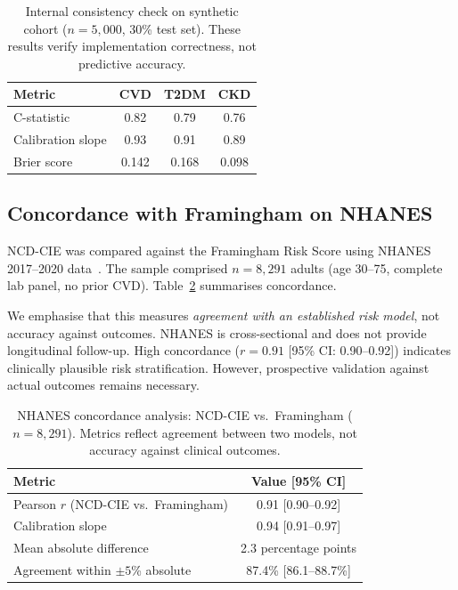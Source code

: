 \documentclass[runningheads]{llncs}
\begin{document}
\renewcommand{\arraystretch}{1.2}
\begin{table}[t]
\centering
\caption{Internal consistency check on synthetic cohort ($n = 5{,}000$,
30\% test set).  These results verify implementation correctness,
not predictive accuracy.}
\label{tab:synthetic}
\small
\begin{tabular}{@{}lccc@{}}
\toprule
\textbf{Metric} & \textbf{CVD} & \textbf{T2DM} & \textbf{CKD} \\
\midrule
C-statistic        & 0.82 & 0.79 & 0.76 \\
Calibration slope  & 0.93 & 0.91 & 0.89 \\
Brier score        & 0.142 & 0.168 & 0.098 \\
\bottomrule
\end{tabular}
\end{table}
\renewcommand{\arraystretch}{1.0}

\subsection{Concordance with Framingham on NHANES}\label{sec:nhanes}

NCD-CIE was compared against the Framingham Risk Score using NHANES
2017--2020 data~\cite{nhanes2020}.
The sample comprised $n = 8{,}291$ adults (age 30--75, complete lab
panel, no prior CVD).
Table~\ref{tab:nhanes} summarises concordance.

We emphasise that this measures \emph{agreement with an established
risk model}, not accuracy against outcomes.
NHANES is cross-sectional and does not provide longitudinal follow-up.
High concordance ($r = 0.91$ [95\% CI: 0.90--0.92]) indicates
clinically plausible risk stratification.
However, prospective validation against actual outcomes remains
necessary.

\renewcommand{\arraystretch}{1.2}
\begin{table}[t]
\centering
\caption{NHANES concordance analysis: NCD-CIE vs.\ Framingham
($n = 8{,}291$).  Metrics reflect agreement between two models,
not accuracy against clinical outcomes.}
\label{tab:nhanes}
\small
\begin{tabular}{@{}lc@{}}
\toprule
\textbf{Metric} & \textbf{Value [95\% CI]} \\
\midrule
Pearson $r$ (NCD-CIE vs.\ Framingham) & 0.91 [0.90--0.92] \\
Calibration slope                       & 0.94 [0.91--0.97] \\
Mean absolute difference                & 2.3 percentage points \\
Agreement within $\pm 5$\% absolute     & 87.4\% [86.1--88.7\%] \\
\bottomrule
\end{tabular}
\end{table}
\renewcommand{\arraystretch}{1.0}
\end{document}

